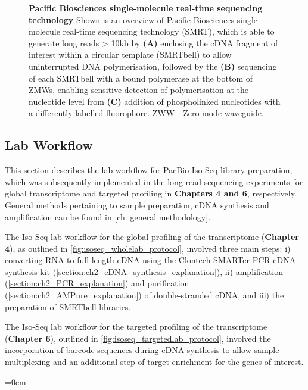 \begin{figure}[!h]
	\captionsetup{width=0.95\textwidth}
	\caption[Pacific Biosciences single-molecule real-time sequencing technology]%
	{\textbf{Pacific Biosciences single-molecule real-time sequencing technology} Shown is an overview of Pacific Biosciences single-molecule real-time sequencing technology (SMRT), which is able to generate long reads > 10kb by \textbf{(A)} enclosing the cDNA fragment of interest within a circular template (SMRTbell) to allow uninterrupted DNA polymerisation,  followed by the \textbf{(B)} sequencing of each SMRTbell with a bound polymerase at the bottom of ZMWs, enabling sensitive detection of polymerisation at the nucleotide level from \textbf{(C)} addition of phospholinked nucleotides with a differently-labelled fluorophore. ZWW - Zero-mode waveguide.}
	\label{fig:Mechanism}
\end{figure}

\clearpage
\subsection{Lab Workflow}
\label{chap:isoseq_labpipeline}
This section describes the lab workflow for PacBio Iso-Seq library preparation, which was subsequently implemented in the long-read sequencing experiments for global transcriptome and targeted profiling in \textbf{Chapters 4 and 6}, respectively. General methods pertaining to sample preparation, cDNA synthesis and amplification can be found in \cref{ch: general methodology}.

The Iso-Seq lab workflow for the global profiling of the transcriptome (\textbf{Chapter 4}), as outlined in \cref{fig:isoseq_wholelab_protocol}, involved three main steps: i) converting RNA to full-length cDNA using the Clontech SMARTer PCR cDNA synthesis kit (\cref{section:ch2_cDNA_synthesis_explanation}), ii) amplification (\cref{section:ch2_PCR_explanation}) and purification (\cref{section:ch2_AMPure_explanation}) of double-stranded cDNA, and iii) the preparation of SMRTbell libraries. 

The Iso-Seq lab workflow for the targeted profiling of the transcriptome (\textbf{Chapter 6}), outlined in \cref{fig:isoseq_targetedlab_protocol}, involved the incorporation of barcode sequences during cDNA synthesis to allow sample multiplexing and an additional step of target enrichment for the genes of interest.

\vspace{3cm}
\begingroup
\parindent=0em
\localtableofcontents 
\endgroup

